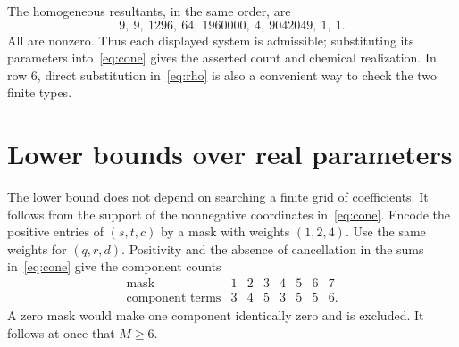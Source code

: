 \documentclass[11pt,a4paper]{article}
\theoremstyle{definition}\newtheorem{definition}[theorem]{Definition}
\begin{document}
The homogeneous resultants, in the same order, are
\[
 9,\ 9,\ 1296,\ 64,\ 1960000,\ 4,\ 9042049,\ 1,\ 1.
\]
All are nonzero. Thus each displayed system is admissible; substituting its
parameters into~\eqref{eq:cone} gives the asserted count and chemical
realization. In row 6, direct substitution in~\eqref{eq:rho} is also a
convenient way to check the two finite types.

\section{Lower bounds over real parameters}\label{sec:lower}
The lower bound does not depend on searching a finite grid of coefficients.
It follows from the support of the nonnegative coordinates in~\eqref{eq:cone}.
Encode the positive entries of $(s,t,c)$ by a mask with weights $(1,2,4)$.
Use the same weights for $(q,r,d)$. Positivity and the absence of cancellation
in the sums in~\eqref{eq:cone} give the component counts
\begin{equation}\label{eq:masks}
\begin{array}{c|rrrrrrr}
 \text{mask}&1&2&3&4&5&6&7\\\hline
 \text{component terms}&3&4&5&3&5&5&6.
\end{array}
\end{equation}
A zero mask would make one component identically zero and is excluded.
It follows at once that $M\geq6$.
\end{document}
